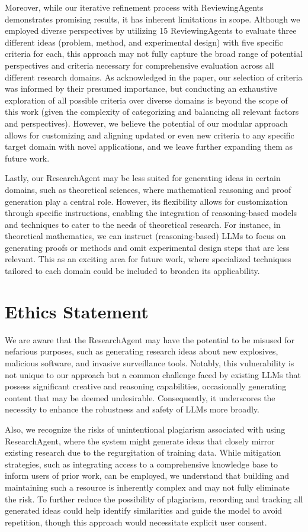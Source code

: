 Moreover, while our iterative refinement process with ReviewingAgents demonstrates promising results, it has inherent limitations in scope. Although we employed diverse perspectives by utilizing 15 ReviewingAgents to evaluate three different ideas (problem, method, and experimental design) with five specific criteria for each, this approach may not fully capture the broad range of potential perspectives and criteria necessary for comprehensive evaluation across all different research domains. As acknowledged in the paper, our selection of criteria was informed by their presumed importance, but conducting an exhaustive exploration of all possible criteria over diverse domains is beyond the scope of this work (given the complexity of categorizing and balancing all relevant factors and perspectives). However, we believe the potential of our modular approach allows for customizing and aligning updated or even new criteria to any specific target domain with novel applications, and we leave further expanding them as future work.

Lastly, our ResearchAgent may be less suited for generating ideas in certain domains, such as theoretical sciences, where mathematical reasoning and proof generation play a central role. However, its flexibility allows for customization through specific instructions, enabling the integration of reasoning-based models and techniques to cater to the needs of theoretical research. For instance, in theoretical mathematics, we can instruct (reasoning-based) LLMs to focus on generating proofs or methods and omit experimental design steps that are less relevant. This as an exciting area for future work, where specialized techniques tailored to each domain could be included to broaden its applicability.

\section*{Ethics Statement}
We are aware that the ResearchAgent may have the potential to be misused for nefarious purposes, such as generating research ideas about new explosives, malicious software, and invasive surveillance tools. Notably, this vulnerability is not unique to our approach but a common challenge faced by existing LLMs that possess significant creative and reasoning capabilities, occasionally generating content that may be deemed undesirable. Consequently, it underscores the necessity to enhance the robustness and safety of LLMs more broadly. 

Also, we recognize the risks of unintentional plagiarism associated with using ResearchAgent, where the system might generate ideas that closely mirror existing research due to the regurgitation of training data. While mitigation strategies, such as integrating access to a comprehensive knowledge base to inform users of prior work, can be employed, we understand that building and maintaining such a resource is inherently complex and may not fully eliminate the risk. To further reduce the possibility of plagiarism, recording and tracking all generated ideas could help identify similarities and guide the model to avoid repetition, though this approach would necessitate explicit user consent.

